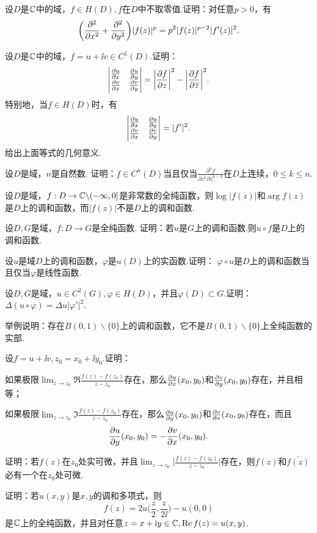 \begin{xiti}
\[     \]
  \item 设$D$是$\mathbb C$中的域，$f\in H(D),f$在$D$中不取零值.证明：对任意$p>0$，有
     \[
       \bigg(\frac{\partial^2 }{\partial x^2} + \frac{\partial^2 }{\partial y^2}\bigg)|f(z)|^p = p^2|f(z)|^{p-2} |f'(z)|^2.
     \]
  \item 设$D$是$\mathbb C$中的域，$f=u+\ii v\in C^1(D)$.证明：
     \[
       \begin{vmatrix}
         \frac{\partial u}{\partial x} & \frac{\partial u}{\partial y}\\
         \frac{\partial v}{\partial x} & \frac{\partial v}{\partial y}
       \end{vmatrix}
       = \bigg| \frac{\partial f}{\partial z} \bigg|^2 - \bigg| \frac{\partial f}{\partial {}\mkern2mu\overline{\mkern-2muz}} \bigg|^2.
     \]
     特别地，当$f\in H(D)$时，有
     \[
       \begin{vmatrix}
         \frac{\partial u}{\partial x} & \frac{\partial u}{\partial y} \\
         \frac{\partial v}{\partial x} & \frac{\partial v}{\partial y}
       \end{vmatrix} = |f'|^2.
     \]
     给出上面等式的几何意义.
  \item 设$D$是域，$n$是自然数. 证明：$f\in C^n(D)$当且仅当$\frac{\partial^nf}{\partial z^k\partial\bar z^{n-k}}$在$D$上连续，$0\le k\le n$.
  \item 设$D$是域，$f:D\to\mathbb C\backslash(-\infty,0]$是非常数的全纯函数，则$\log |f(z)|$和$\arg f(z)$是$D$上的调和函数，而$|f(z)|$不是$D$上的调和函数.
  \item 设$D,G$是域，$f:D\to G$是全纯函数. 证明：若$u$是$G$上的调和函数.则$u\circ f$是$D$上的调和函数.
  \item 设$u$是域$D$上的调和函数，$\varphi$是$u(D)$上的实函数.证明：
       $\varphi\circ u$是$D$上的调和函数当且仅当$\varphi$是线性函数.
  \item 设$D,G$是域，$u\in C^2(G),\varphi\in H(D)$，并且$\varphi(D)\subset G$.证明：$\Delta (u\circ \varphi)=\Delta u|\varphi'|^2$.
  \item 举例说明：存在$B(0,1)\backslash\{0\}$上的调和函数，它不是$B(0,1)\backslash\{0\}$上全纯函数的实部.
  \item 设$f=u+\ii v,z_0=x_0+\ii y_0$.证明：
    \begin{enuma}
      \item 如果极限$\lim_{z\to z_0}\Re\frac{f(z)-f(z_0)}{z-z_0}$存在，那么$\frac{\partial u}{\partial x}(x_0,y_0)$和$\frac{\partial v}{\partial y}(x_0,y_0)$存在，并且相等；
      \item 如果极限$\lim_{z\to z_0}\Im\frac{f(z)-f(z_0)}{z-z_0}$存在，那么$\frac{\partial u}{\partial y}(x_0,y_0)$和$\frac{\partial v}{\partial x}(x_0,y_0)$存在，而且
          \[
           \frac{\partial u}{\partial y}(x_0,y_0) = -\frac{\partial v}{\partial x}(x_0,y_0).
          \]
    \end{enuma}
  \item 证明：若$f(z)$在$z_0$处实可微，并且$\lim_{z\to z_0}\bigg|\frac{f(z)-f(z_0)}{z-z_0}\bigg|$存在，则$f(z)$和$\bar{f(z)}$必有一个在$z_0$处可微.
  \item 证明：若$u(x,y)$是$x,y$的调和多项式，则
     \[
       f(z) = 2u\bigg( \frac z2,\frac z{2\ii} \bigg) - u(0,0)
     \]
     是$\mathbb C$上的全纯函数，并且对任意$z=x+\mathrm i y\in\mathbb C,\operatorname{Re} f(z)=u(x,y)$.
\end{xiti}

